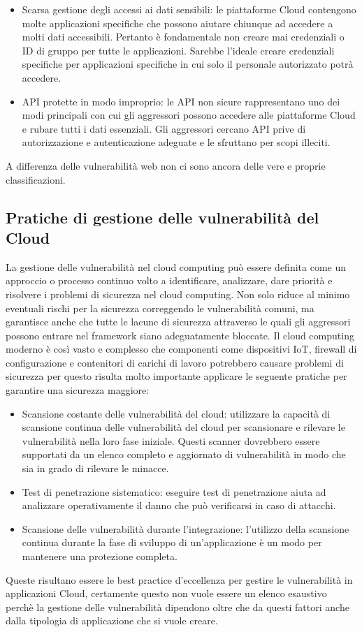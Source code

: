 \begin{itemize}
    \item Scarsa gestione degli accessi ai dati sensibili: le piattaforme Cloud contengono molte applicazioni specifiche che possono aiutare chiunque ad accedere a molti dati accessibili. Pertanto è fondamentale non creare mai credenziali o ID di gruppo per tutte le applicazioni. Sarebbe l’ideale creare credenziali specifiche per applicazioni specifiche in cui solo il personale autorizzato potrà accedere.
    \item API protette in modo improprio: le API non sicure rappresentano uno dei modi principali con cui gli aggressori possono accedere alle piattaforme Cloud e rubare tutti i dati essenziali.  Gli aggressori cercano API prive di autorizzazione e autenticazione adeguate e le sfruttano per scopi illeciti. 
\end{itemize}
A differenza delle vulnerabilità web non ci sono ancora delle vere e proprie classificazioni.
\subsection{Pratiche di gestione delle vulnerabilità del Cloud}
La gestione delle vulnerabilità nel cloud computing può essere definita come un approccio o processo continuo volto a identificare, analizzare, dare priorità e risolvere i problemi di sicurezza nel cloud computing.
Non solo riduce al minimo eventuali rischi per la sicurezza correggendo le vulnerabilità comuni, ma garantisce anche che tutte le lacune di sicurezza attraverso le quali gli aggressori possono entrare nel framework siano adeguatamente bloccate.
Il cloud computing moderno è così vasto e complesso che componenti come dispositivi IoT, firewall di configurazione e contenitori di carichi di lavoro potrebbero causare problemi di sicurezza per questo risulta molto importante applicare le seguente pratiche per garantire una sicurezza maggiore:

\begin{itemize}
    \item Scansione costante delle vulnerabilità del cloud: utilizzare la capacità di scansione continua delle vulnerabilità del cloud per scansionare e rilevare le vulnerabilità nella loro fase iniziale. Questi scanner dovrebbero essere supportati da un elenco completo e aggiornato di vulnerabilità in modo che sia in grado di rilevare le minacce.
    \item Test di penetrazione sistematico: eseguire test di penetrazione aiuta ad analizzare operativamente il danno che può verificarsi in caso di attacchi.
    \item Scansione delle vulnerabilità durante l’integrazione: l’utilizzo della scansione continua durante la fase di sviluppo di un’applicazione è un modo per mantenere una protezione completa.
\end{itemize}
Queste risultano essere le best practice d'eccellenza per gestire le vulnerabilità in applicazioni Cloud, certamente questo non vuole essere un elenco esaustivo perchè la gestione delle vulnerabilità dipendono oltre che da questi fattori anche dalla tipologia di applicazione che si vuole creare. 
\cite{gestione_vulnerabiltà}
